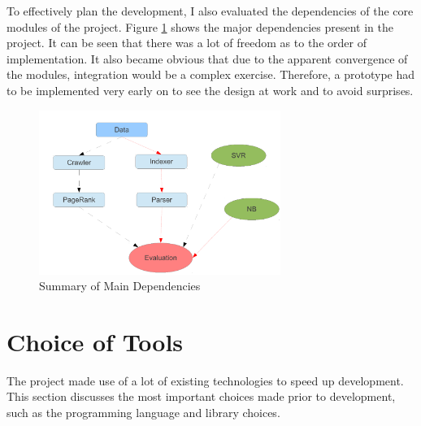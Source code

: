 \documentclass[12pt,notitlepage,twoside]{scrbook}
\begin{document}
To effectively plan the development, I also evaluated the dependencies of the core modules
of the project. Figure \ref{dep} shows the major dependencies present in the project. It
can be seen that there was a lot of freedom as to the order of implementation. It also
became obvious that due to the apparent convergence of the modules, integration would be a
complex exercise. Therefore, a prototype had to be implemented very early on to see the
design at work and to avoid surprises.
\begin{figure}[h!]
	\centering
	\includegraphics[width=0.7\textwidth]{figs/dep.pdf}
	\caption{Summary of Main Dependencies\label{dep}}
\end{figure}

\section{Choice of Tools}
The project made use of a lot of existing technologies to speed up development. This
section discusses the most important choices made prior to development, such as the
programming language and library choices.
\end{document}
